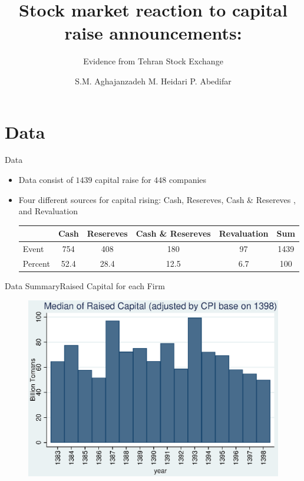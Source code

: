 \documentclass{beamer}
\title[Capital Raise]{Stock market reaction to capital raise announcements:}
\subtitle{Evidence from Tehran Stock Exchange}
\author[Aghajanzadeh, Heidari \&Abedifar]{S.M. Aghajanzadeh \qquad M. Heidari \qquad P. Abedifar }
\institute[]{Tehran Institute for Advanced Studies }
\begin{document}
{\maketitle}

\section{Data}
\begin{frame}{Data}
\begin{itemize}
\item Data consist of $1439$ capital raise for $448$ companies 

\item Four different sources for capital rising: Cash, Resereves, Cash \& Resereves , and Revaluation \\

\begin{table}[htbp]
  \centering
\label{t1}
\resizebox{0.7\textwidth}{!}
{
    \begin{tabular}{lccccc}
    \hline
    \hline
          & \multicolumn{1}{l}{Cash} & \multicolumn{1}{c}{Resereves} & \multicolumn{1}{c}{Cash \& Resereves} & \multicolumn{1}{c}{Revaluation} &  \multicolumn{1}{c}{Sum} \\
          \hline
    Event & 754   & 408   & 180   & 97       & 1439 \\
    Percent & 52.4  & 28.4  & 12.5  & 6.7    & 100 \\
    \hline\hline
    \end{tabular}
    }
  \label{tab:addlabel}
  
\end{table}%


\end{itemize}

\end{frame}






\begin{frame}{Data Summary}{Raised Capital for each Firm}
\begin{figure}
\centering
\includegraphics[width=0.7\linewidth]{MedianCapRaiseAdjusted.eps}
\label{fig:mediancapraise}
\end{figure}
\end{frame}
\end{document}
